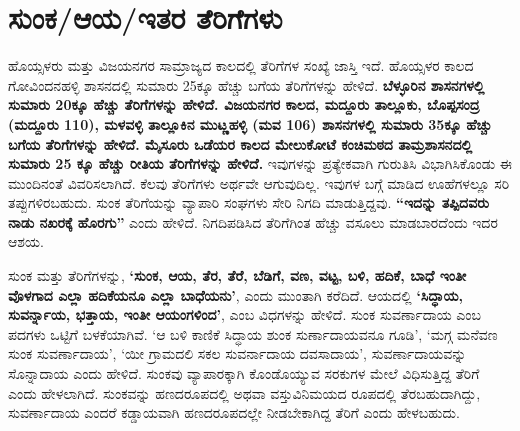 \newpage

\section*{ಸುಂಕ/ಆಯ/ಇತರ ತೆರಿಗೆಗಳು}

ಹೊಯ್ಸಳರು ಮತ್ತು ವಿಜಯನಗರ ಸಾಮ್ರಾಜ್ಯದ ಕಾಲದಲ್ಲಿ ತೆರಿಗೆಗಳ ಸಂಖ್ಯೆ ಜಾಸ್ತಿ ಇದೆ. ಹೊಯ್ಸಳರ ಕಾಲದ ಗೋವಿಂದನಹಳ್ಳಿ ಶಾಸನದಲ್ಲಿ ಸುಮಾರು 25ಕ್ಕೂ ಹೆಚ್ಚು ಬಗೆಯ ತೆರಿಗೆಗಳನ್ನು ಹೇಳಿದೆ. \textbf{ಬೆಳ್ಳೂರಿನ ಶಾಸನಗಳಲ್ಲಿ ಸುಮಾರು 20ಕ್ಕೂ ಹೆಚ್ಚು ತೆರಿಗೆಗಳನ್ನು ಹೇಳಿದೆ. ವಿಜಯನಗರ ಕಾಲದ, ಮದ್ದೂರು ತಾಲ್ಲೂಕು, ಬೊಪ್ಪಸಂದ್ರ (ಮದ್ದೂರು 110), ಮಳವಳ್ಳಿ ತಾಲ್ಲೂಕಿನ ಮುಟ್ಣಹಳ್ಳಿ (ಮವ 106) ಶಾಸನಗಳಲ್ಲಿ ಸುಮಾರು 35ಕ್ಕೂ ಹೆಚ್ಚು ಬಗೆಯ ತೆರಿಗೆಗಳನ್ನು ಹೇಳಿದೆ. ಮೈಸೂರು ಒಡೆಯರ ಕಾಲದ ಮೇಲುಕೋಟೆ ಕಂಚಿಮಠದ ತಾಮ್ರಶಾಸನದಲ್ಲಿ ಸುಮಾರು 25 ಕ್ಕೂ ಹೆಚ್ಚು ರೀತಿಯ ತೆರಿಗೆಗಳನ್ನು ಹೇಳಿದೆ.} ಇವುಗಳನ್ನು ಪ್ರತ್ಯೇಕವಾಗಿ ಗುರುತಿಸಿ ವಿಭಾಗಿಸಿಕೊಂಡು ಈ ಮುಂದಿನಂತೆ ವಿವರಿಸಲಾಗಿದೆ. ಕೆಲವು ತೆರಿಗೆಗಳು ಅರ್ಥವೇ ಆಗುವುದಿಲ್ಲ. ಇವುಗಳ ಬಗ್ಗೆ ಮಾಡಿದ ಊಹೆಗಳಲ್ಲೂ ಸರಿ ತಪ್ಪುಗಳಿರಬಹುದು. ಸುಂಕ ತೆರಿಗೆಯನ್ನು ವ್ಯಾಪಾರಿ ಸಂಘಗಳು ಸೇರಿ ನಿಗದಿ ಮಾಡುತ್ತಿದ್ದವು. \textbf{“ಇದನ್ನು ತಪ್ಪಿದವರು ನಾಡು ನಖರಕ್ಕೆ ಹೊರಗು”} ಎಂದು ಹೇಳಿದೆ. ನಿಗದಿಪಡಿಸಿದ ತೆರಿಗೆಗಿಂತ ಹೆಚ್ಚು ವಸೂಲು ಮಾಡಬಾರದೆಂದು ಇದರ ಆಶಯ.

ಸುಂಕ ಮತ್ತು ತೆರಿಗೆಗಳನ್ನು, \textbf{‘ಸುಂಕ, ಆಯ, ತೆರ, ತೆರೆ, ಬೆಡಿಗೆ, ವಣ, ವಟ್ಟ, ಬಳಿ, ಹದಿಕೆ, ಬಾಧೆ ಇಂತೀ ವೊಳಗಾದ ಎಲ್ಲಾ ಹದಿಕೆಯನೂ ಎಲ್ಲಾ ಬಾಧೆಯನು’}, ಎಂದು ಮುಂತಾಗಿ ಕರೆದಿದೆ. ಆಯದಲ್ಲಿ \textbf{‘ಸಿದ್ಧಾಯ, ಸುವರ್ನ್ನಾಯ, ಭತ್ತಾಯ, ಇಂತೀ ಆಯಂಗಳಿಂದ’}, ಎಂಬ ವಿಧಗಳನ್ನು ಹೇಳಿದೆ. ಸುಂಕ ಸುವರ್ಣಾದಾಯ ಎಂಬ ಪದಗಳು ಒಟ್ಟಿಗೆ ಬಳಕೆಯಾಗಿವೆ. ‘ಆ ಬಳಿ ಕಾಣಿಕೆ ಸಿದ್ಧಾಯ ಶುಂಕ ಸುರ್ಣಾದಾಯವನೂ ಗೂಡಿ’, ‘ಮಗ್ಗ ಮನೆವಣ ಸುಂಕ ಸುವರ್ಣಾದಾಯ’, ‘ಯೀ ಗ್ರಾಮದಲಿ ಸಕಲ ಸುವರ್ನಾದಾಯ ದವಸಾದಾಯ’, ಸುವರ್ಣಾದಾಯವನ್ನು ಸೊನ್ನಾದಾಯ ಎಂದು ಹೇಳಿದೆ. ಸುಂಕವು ವ್ಯಾಪಾರಕ್ಕಾಗಿ ಕೊಂಡೊಯ್ಯುವ ಸರಕುಗಳ ಮೇಲೆ ವಿಧಿಸುತ್ತಿದ್ದ ತೆರಿಗೆ ಎಂದು ಹೇಳಲಾಗಿದೆ. ಸುಂಕವನ್ನು ಹಣದರೂಪದಲ್ಲಿ ಅಥವಾ ವಸ್ತುವಿನಿಮಯದ ರೂಪದಲ್ಲಿ ತೆರಬಹುದಾಗಿದ್ದು, ಸುವರ್ಣಾದಾಯ ಎಂದರೆ ಕಡ್ಡಾಯವಾಗಿ ಹಣದರೂಪದಲ್ಲೇ ನೀಡಬೇಕಾಗಿದ್ದ ತೆರಿಗೆ ಎಂದು ಹೇಳಬಹುದು.


